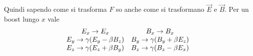 \documentclass[a4paper,10pt,oneside]{math_article}
\begin{document}
				Quindi sapendo come si trasforma $F$ so anche come si trasformano $\vec E$ e $\vec B$. Per un boost lungo $x$ vale 
				\[
				 \begin{array}{cc}
					E_x \rightarrow E_x												& B_x \rightarrow B_x											\\
					E_y \rightarrow \gamma (E_y - \beta B_z) 	& B_y \rightarrow \gamma (B_y + \beta E_z) \\
					E_z \rightarrow \gamma (E_z + \beta B_y) 	& B_z \rightarrow \gamma (B_z - \beta E_x)
				 \end{array}
				\]








	
\end{document}

